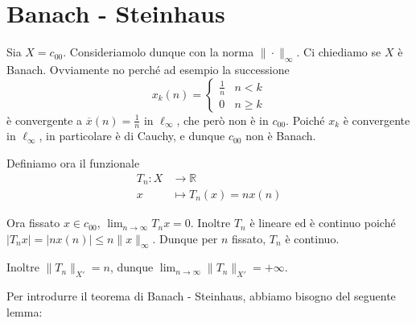 \section{Banach \-- Steinhaus}
Sia \(X = c_{00}\). Consideriamolo dunque con la norma \(\|\cdot \|_{\infty}\).
Ci chiediamo se \(X\) è Banach. Ovviamente no perché ad esempio la successione 
\[
  x_k{(n)} = \begin{cases}{}
      \frac{1}{n} & n < k \\
      0 & n \ge k
  \end{cases}
\]
è convergente a \(\overline{x}{(n)} = \frac{1}{n}\) in \(\ell_{\infty} \), che
però non è in \(c_{00}\). Poiché \(x_k\) è convergente in \(\ell_{\infty}\), in
particolare è di Cauchy, e dunque \(c_{00} \) non è Banach.

Definiamo ora il funzionale
\begin{align*}
    T_{n}: X &\longrightarrow \mathbb{R} \\
    x &\longmapsto T_{n}(x) = n x{(n)}
\end{align*}

Ora fissato \(x \in c_{00}\), \(\lim_{n \to \infty} T_n x = 0\). Inoltre \(T_{n}\) è lineare ed è continuo poiché \(|T_n x | = | n x {(n)} | \le n \|x\|_{\infty} \). Dunque per \(
n\) fissato, \(T_n\) è continuo.

Inoltre \(\|T_{n}\|_{X'} = n \), dunque \(\lim_{n \to \infty} \|T_{n}\|_{X'} = +
\infty\).


Per introdurre il teorema di Banach \-- Steinhaus, abbiamo bisogno del seguente lemma:

